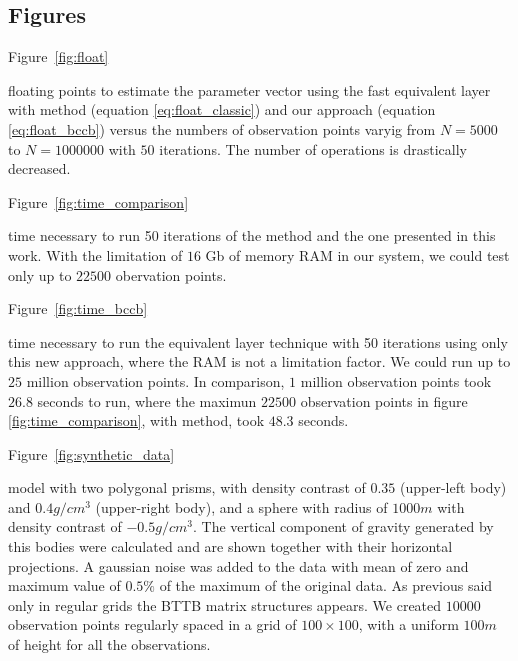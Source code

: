 \documentclass[manuscript,revised]{geophysics}
\renewcommand{\figdir}{figures} %
\begin{document}
\newpage



\subsection*{Figures}
\renewcommand{\figdir}{Fig} %

Figure~\ref{fig:float}

{floating points to estimate the parameter vector using the fast equivalent layer with \citet{siqueira-etal2017} method (equation \ref{eq:float_classic}) and our approach (equation \ref{eq:float_bccb}) versus the numbers of observation points varyig from $N = 5000$ to $N = 1000000$ with $50$ iterations. The number of operations is drastically decreased.}
\newpage

Figure~\ref{fig:time_comparison}

{time necessary to run 50 iterations of the \citet{siqueira-etal2017} method and the one presented in this work. With the limitation of $16$ Gb of memory RAM in our system, we could test only up to $22500$ obervation points.}

Figure~\ref{fig:time_bccb}

{time necessary to run the equivalent layer technique with 50 iterations using only this new approach, where the RAM is not a limitation factor. We could run up to $25$ million observation points. In comparison, $1$ million observation points took $26.8$ seconds to run, where the maximun $22500$ observation points in figure \ref{fig:time_comparison}, with \citet{siqueira-etal2017} method, took $48.3$ seconds.}
\newpage

Figure~\ref{fig:synthetic_data}

{model with two polygonal prisms, with density contrast of $0.35$ (upper-left body) and $0.4 g/cm^3$ (upper-right body), and a sphere with radius of $1000 m$ with density contrast of $-0.5 g/cm^3$. The vertical component of gravity generated by this bodies were calculated and are shown together with their horizontal projections. A gaussian noise was added to the data with mean of zero and maximum value of $0.5\%$ of the maximum of the original data. As previous said only in regular grids the BTTB matrix structures appears. We created $10000$ observation points regularly spaced in a grid of $100 \times 100$, with a uniform $100 m$ of height for all the observations.}
\newpage
\end{document}
